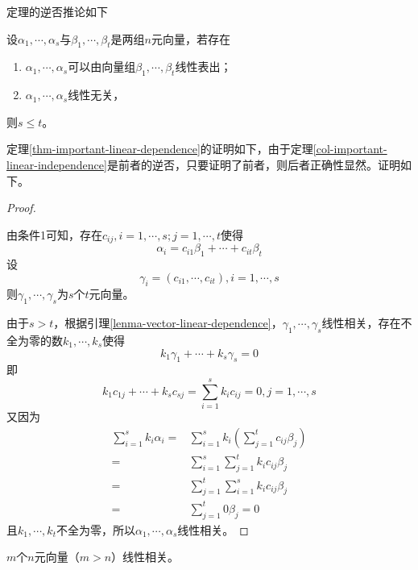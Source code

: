定理的逆否推论如下

\begin{corollary}
    \label{col-important-linear-independence}
    设$\alpha_1,\cdots,\alpha_s$与$\beta_1,\cdots,\beta_t$是两组$n$元向量，若存在
    \begin{enumerate}
        \item $\alpha_1,\cdots,\alpha_s$可以由向量组$\beta_1,\cdots,\beta_t$线性表出；
        \item $\alpha_1,\cdots,\alpha_s$线性无关，
    \end{enumerate}
    则$s\leqslant t$。
\end{corollary}

定理\ref{thm-important-linear-dependence}的证明如下，由于定理\ref{col-important-linear-independence}是前者的逆否，只要证明了前者，则后者正确性显然。证明如下。

\begin{proof}
    \label{proof-important-linear-dependence}

    由条件1可知，存在$c_{ij},i=1,\cdots,s;j=1,\cdots,t$使得
    \[ \alpha_i=c_{i1}\beta_1+\cdots+c_{it}\beta_t \]
    设
    \[ \gamma_i=(c_{i1},\cdots,c_{it}),i=1,\cdots,s \]
    则$\gamma_1,\cdots,\gamma_s$为$s$个$t$元向量。

    由于$s>t$，根据引理\ref{lenma-vector-linear-dependence}，$\gamma_1,\cdots,\gamma_s$线性相关，存在不全为零的数$k_1,\cdots,k_s$使得
    \[ k_1\gamma_1+\cdots+k_s\gamma_s=0 \]
    即
    \[ k_1c_{1j}+\cdots+k_sc_{sj}=\sum_{i=1}^sk_ic_{ij}=0,j=1,\cdots,s \]
    又因为
    \begin{equation*}
        \begin{aligned}
            \sum_{i=1}^sk_i\alpha_i
            =& \sum_{i=1}^sk_i\left(\sum_{j=1}^tc_{ij}\beta_j\right) \\
            =& \sum_{i=1}^s\sum_{j=1}^tk_ic_{ij}\beta_j \\
            =& \sum_{j=1}^t\sum_{i=1}^sk_ic_{ij}\beta_j \\
            =& \sum_{j=1}^t0\beta_j=0
        \end{aligned}
    \end{equation*}
    且$k_1,\cdots,k_t$不全为零，所以$\alpha_1,\cdots,\alpha_s$线性相关。
\end{proof}

\begin{lemma}
    \label{lenma-vector-linear-dependence}
    $m$个$n$元向量（$m>n$）线性相关。
\end{lemma}

